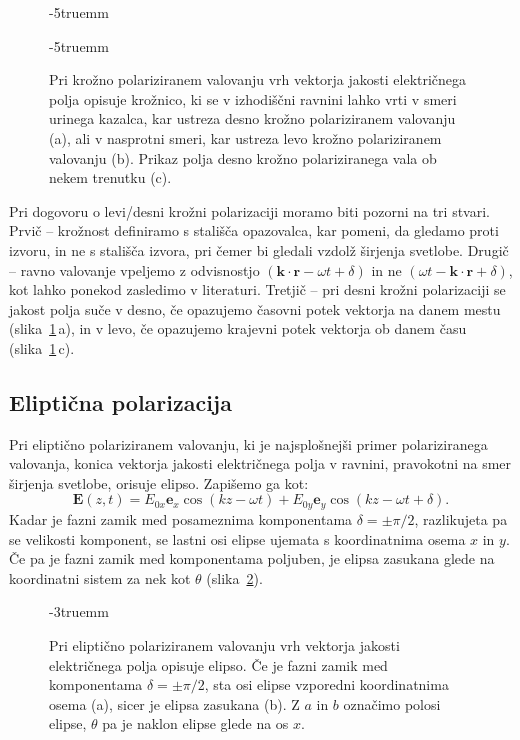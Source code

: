 \begin{figure}[ht]
\centering
\def\svgwidth{140truemm} 

\vglue-5truemm
\caption{Pri krožno polariziranem valovanju vrh vektorja
jakosti električnega polja opisuje krožnico, ki se v izhodiščni ravnini
lahko vrti v smeri urinega kazalca, kar ustreza desno krožno polariziranem valovanju (a),
ali v nasprotni smeri, kar ustreza levo krožno polariziranem valovanju (b). 
Prikaz polja desno krožno polariziranega vala ob nekem trenutku (c).}
\label{fig:03_cirkpol}
\vglue-5truemm
\end{figure}

\begin{remark}
Pri dogovoru o levi/desni krožni polarizaciji moramo biti pozorni na tri stvari. 
Prvič -- krožnost definiramo s stališča opazovalca, kar pomeni, da gledamo proti izvoru,
in ne s stališča izvora, pri čemer bi gledali vzdolž širjenja svetlobe. Drugič --
ravno valovanje vpeljemo z odvisnostjo $(\mathbf{k}\cdot \mathbf{r} - \omega t + \delta)$ in 
ne $(\omega t - \mathbf{k}\cdot \mathbf{r} + \delta)$, kot lahko ponekod zasledimo v literaturi.
Tretjič -- pri desni krožni polarizaciji se jakost polja suče v desno, če opazujemo 
časovni potek vektorja na danem mestu (slika~\ref{fig:03_cirkpol}\,a), in v levo, 
če opazujemo krajevni potek vektorja ob danem času (slika~\ref{fig:03_cirkpol}\,c).
\end{remark}

\subsection*{Eliptična polarizacija}
Pri eliptično polariziranem valovanju, ki je najsplošnejši primer polariziranega valovanja,
konica vektorja jakosti električnega polja v ravnini, pravokotni na smer širjenja svetlobe, orisuje elipso. 
Zapišemo ga kot:
\begin{equation}
\mathbf{E} (z, t) = E_{0x} \mathbf{e}_x \cos \left(kz - \omega t\right)
+ E_{0y} \mathbf{e}_y \cos \left(kz - \omega t + \delta\right)\!.
\label{eq:elipticnapol}
\end{equation}
Kadar je fazni zamik med posameznima komponentama $\delta = \pm \pi/2$, razlikujeta
pa se velikosti komponent, se lastni osi elipse ujemata s koordinatnima
osema $x$ in $y$. Če pa je fazni zamik med komponentama poljuben, je elipsa
zasukana glede na koordinatni sistem za nek kot $\theta$ (slika~\ref{fig:03_elipspol}). 
\begin{figure}[ht]
\centering
\def\svgwidth{120truemm} 

\caption{Pri eliptično polariziranem valovanju vrh vektorja
jakosti električnega polja opisuje elipso. Če je fazni zamik med komponentama
$\delta = \pm \pi/2$, sta osi elipse vzporedni koordinatnima osema (a), sicer
je elipsa zasukana (b). Z $a$ in $b$ označimo polosi elipse, $\theta$ pa je
naklon elipse glede na os $x$.}
\label{fig:03_elipspol}
\vglue-3truemm
\end{figure}

